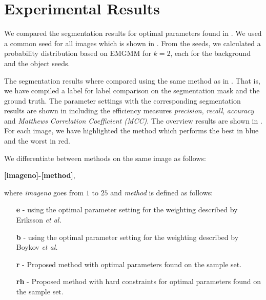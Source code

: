 \clearpage
\section{Experimental Results}
\label{sec:interactiveresults}

We compared the segmentation results for optimal parameters found in . We used a common seed for all images which is shown in . From the seeds, we calculated a probability distribution based on EMGMM for $k=2$, each for the background and the object seeds.

The segmentation results where compared using the same method as in . That is, we have compiled a label for label comparison on the segmentation mask and the ground truth. The parameter settings with the corresponding segmentation results are shown in  including the efficiency measures \textit{precision}, \textit{recall}, \textit{accuracy} and \textit{Matthews Correlation Coefficient (MCC)}. The overview results are shown in . For each image, we have highlighted the method which performs the best in blue and the worst in red.

We differentiate between methods on the same image as follows:

\textbf{[imageno]-[method]}, 

where \textit{imageno} goes from $1$ to $25$ and \textit{method} is defined as follows:
\begin{enumerate}
	\item [\textbf{e}] - using the optimal parameter setting for the weighting described by Eriksson \textit{et al.}
	\item [\textbf{b}] - using the optimal parameter setting for the weighting described by Boykov \textit{et al.}
	\item [\textbf{r}] - Proposed method with optimal parameters found on the sample set.
	\item [\textbf{rh}] - Proposed method with hard constraints for optimal parameters found on the sample set.
\end{enumerate}

